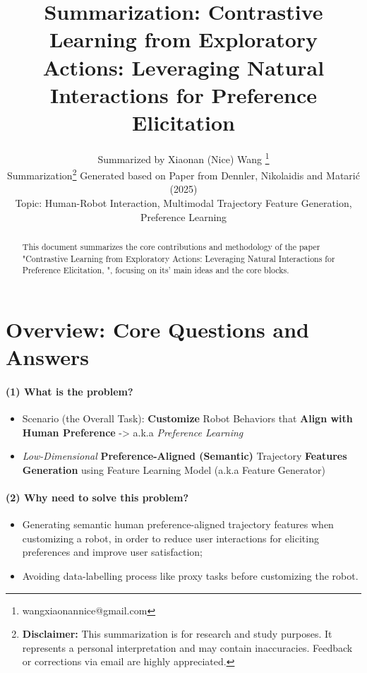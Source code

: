 \documentclass{article}
\title{Summarization: Contrastive Learning from Exploratory Actions: Leveraging Natural Interactions for Preference Elicitation}
\author{
  Summarized by Xiaonan (Nice) Wang \thanks{wangxiaonannice@gmail.com} \\
  Summarization\thanks{\textbf{Disclaimer:} This summarization is for research and study purposes. It represents a personal interpretation and may contain inaccuracies. Feedback or corrections via email are highly appreciated.} Generated based on Paper from Dennler, Nikolaidis and Matari{\'c} (2025) \\
  Topic: Human-Robot Interaction, Multimodal Trajectory Feature Generation, Preference Learning \\
}
\begin{document}
\maketitle

\begin{abstract}
This document summarizes the core contributions and methodology of the paper "Contrastive Learning from Exploratory Actions: Leveraging Natural Interactions for Preference Elicitation, \cite{dennler2025contrastive}", focusing on its' main ideas and the core blocks.
\end{abstract}

\section{Overview: Core Questions and Answers}

\paragraph{(1) What is the problem?} 
\begin{itemize}
  \item Scenario (the Overall Task): \textbf{Customize} Robot Behaviors that \textbf{Align with Human Preference} -> a.k.a \textit{Preference Learning}
  \item \textit{Low-Dimensional} \textbf{Preference-Aligned (Semantic)} Trajectory \textbf{Features Generation} using Feature Learning Model (a.k.a Feature Generator)
\end{itemize}

\paragraph{(2) Why need to solve this problem?}
\begin{itemize}
  \item Generating semantic human preference-aligned trajectory features when customizing a robot, in order to reduce user interactions for eliciting preferences and improve user satisfaction;
  \item Avoiding data-labelling process like proxy tasks before customizing the robot.
\end{itemize}
\end{document}
